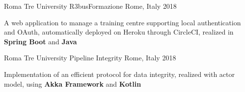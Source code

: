 

\begin{cventries}

  \cventry
    {Roma Tre University} %
    {R3busFormazione} %
    {Rome, Italy} %
    {2018} %
    {
      \begin{cvitems} %
        \item {A web application to manage a training centre supporting local authentication and OAuth, automatically deployed on Heroku through CircleCI, realized in \textbf{Spring Boot} and \textbf{Java}}
      \end{cvitems}
    }

  \cventry
    {Roma Tre University} %
    {Pipeline Integrity} %
    {Rome, Italy} %
    {2018} %
    {
      \begin{cvitems} %
        \item {Implementation of an efficient protocol for data integrity, realized with actor model, using \textbf{Akka Framework} and \textbf{Kotlin}}
      \end{cvitems}
    }

\end{cventries}
